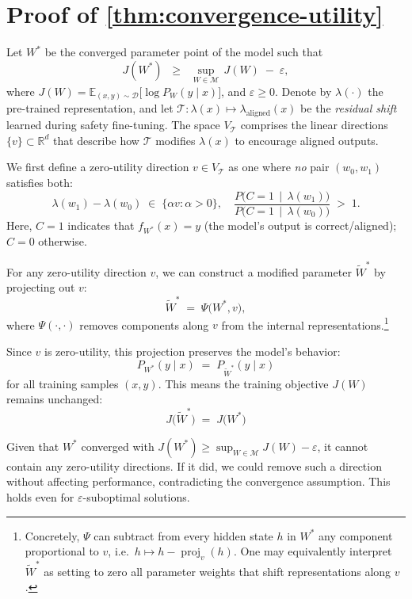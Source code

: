 \onecolumn
\section{Proof of \autoref{thm:convergence-utility}}
\label{appd:proof}

Let $W^*$ be the converged parameter point of the model such that 
\[
J(W^*) \;\;\ge\;\; \sup_{W \in \mathcal{M}}\, J(W)\;-\;\varepsilon,
\]
where $J(W) = \mathbb{E}_{(x,y)\sim \mathcal{D}}\!\bigl[\log P_W(y \mid x)\bigr]$, and $\varepsilon \ge 0$. Denote by $\lambda(\cdot)$ the pre-trained representation, and let $\mathcal{T} : \lambda(x)\mapsto \lambda_{\text{aligned}}(x)$ be the \emph{residual shift} learned during safety fine-tuning. The space $V_{\mathcal{T}}$ comprises the linear directions $\{v\}\subset \mathbb{R}^d$ that describe how $\mathcal{T}$ modifies $\lambda(x)$ to encourage aligned outputs.

We first define a zero-utility direction $v\in V_{\mathcal{T}}$ as one where \emph{no} pair $(w_0,w_1)$ satisfies both:
\begin{equation}
\label{eq:utility-criterion}
\lambda(w_1) - \lambda(w_0) \;\in\; \{\alpha v : \alpha > 0\},
\quad
\frac{P\bigl(C=1 \,\mid\, \lambda(w_1)\bigr)}
     {P\bigl(C=1 \,\mid\, \lambda(w_0)\bigr)}
\;>\; 1.
\end{equation}
Here, $C=1$ indicates that $f_{W^*}(x) = y$ (the model's output is correct/aligned); $C=0$ otherwise.

For any zero-utility direction $v$, we can construct a modified parameter $\widetilde{W}^*$ by projecting out $v$:
\[
\widetilde{W}^*\;=\;\Psi\bigl(W^*, v\bigr),
\]
where $\Psi(\cdot,\cdot)$ removes components along $v$ from the internal representations.\footnote{%
Concretely, $\Psi$ can subtract from every hidden state $h$ in $W^*$ any component proportional to $v$, i.e.\ $h \mapsto h - \operatorname{proj}_v(h)$. One may equivalently interpret $\widetilde{W}^*$ as setting to zero all parameter weights that shift representations along $v$.}

Since $v$ is zero-utility, this projection preserves the model's behavior:
\begin{equation}
\label{eq:same-likelihood}
P_{W^*}(y \mid x) \;=\; P_{\widetilde{W}^*}(y \mid x)
\end{equation}
for all training samples $(x,y)$. This means the training objective $J(W)$ remains unchanged:
\[
J\bigl(\widetilde{W}^*\bigr) \;=\; J\bigl(W^*\bigr)
\]

Given that $W^*$ converged with $J(W^*) \ge \sup_{W\in \mathcal{M}} J(W) - \varepsilon$, it cannot contain any zero-utility directions. If it did, we could remove such a direction without affecting performance, contradicting the convergence assumption. This holds even for $\varepsilon$-suboptimal solutions.

